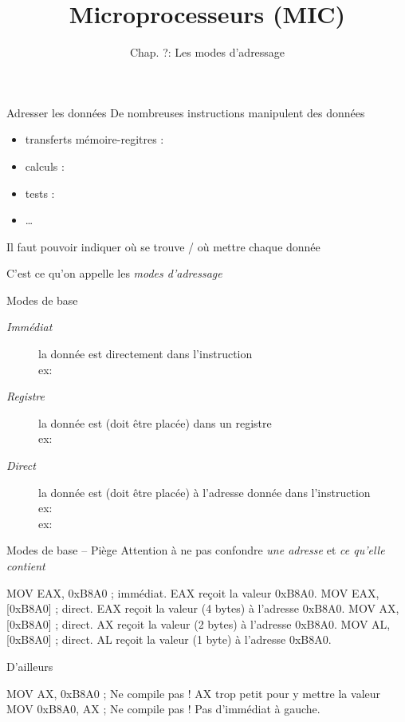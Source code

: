 \documentclass[14pt]{beamer}
\title{Microprocesseurs (MIC)}
\subtitle{Chap. ?: Les modes d'adressage}
\date{}
\begin{document}
\begin{frame}
\titlepage
\end{frame}

\begin{frame}[fragile]{Adresser les données}
De nombreuses instructions manipulent des données
	\begin{itemize}
	\item transferts mémoire-regitres : 
	\item calculs : 
	\item tests : 
	\item \dots
	\end{itemize}

\medskip
Il faut pouvoir indiquer où se trouve / où mettre chaque donnée

\medskip
C'est ce qu'on appelle les \emph{modes d'adressage}
\end{frame}

\begin{frame}[fragile]{Modes de base}
\begin{description}
  \item[\emph{Immédiat}] 
	la donnée est directement dans l'instruction
	\\ex:  
  \item[\emph{Registre}] la donnée est (doit être placée) dans un registre
	\\ex:  \asm{,} 
  \item[\emph{Direct}] la donnée est (doit être placée) à l'adresse donnée dans l'instruction
	\\ex:  \fbox{\asm{[0xB8A0]}}
	\\ex:  \fbox{\asm{[0xB8A2]}}
\end{description}
\end{frame}

\begin{frame}[fragile]{Modes de base -- Piège}
Attention à ne pas confondre \emph{une adresse} et \emph{ce qu'elle contient}
\begin{Asm}
	MOV EAX, 0xB8A0      ; immédiat. EAX reçoit la valeur 0xB8A0.
	MOV EAX, [0xB8A0]    ; direct. EAX reçoit la valeur (4 bytes) à l'adresse 0xB8A0.
	MOV AX, [0xB8A0]     ; direct. AX reçoit la valeur (2 bytes) à l'adresse 0xB8A0.
	MOV AL, [0xB8A0]     ; direct. AL reçoit la valeur (1 byte) à l'adresse 0xB8A0.
\end{Asm}
\bigskip
D'ailleurs
\begin{Asm}
	MOV AX, 0xB8A0      ; Ne compile pas ! AX trop petit pour y mettre la valeur
	MOV 0xB8A0, AX      ; Ne compile pas ! Pas d'immédiat à gauche.
\end{Asm}
\end{frame}
\end{document}

